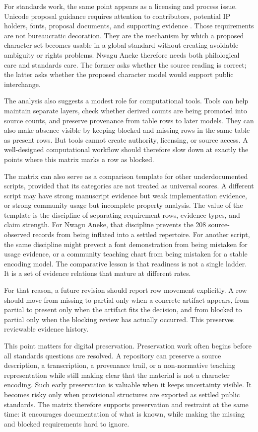\documentclass[sigconf,nonacm]{acmart}
\begin{document}
For standards work, the same point appears as a licensing and process issue.
Unicode proposal guidance requires attention to contributors, potential IP
holders, fonts, proposal documents, and supporting evidence
\cite{unicodeProposals}. Those requirements are not bureaucratic decoration.
They are the mechanism by which a proposed character set becomes usable in a
global standard without creating avoidable ambiguity or rights problems. Nwagu
Aneke therefore needs both philological care and standards care. The former
asks whether the source reading is correct; the latter asks whether the
proposed character model would support public interchange.

The analysis also suggests a modest role for computational tools. Tools can
help maintain separate layers, check whether derived counts are being promoted
into source counts, and preserve provenance from table rows to later models.
They can also make absence visible by keeping blocked and missing rows in the
same table as present rows. But tools cannot create authority, licensing, or
source access. A well-designed computational workflow should therefore slow
down at exactly the points where this matrix marks a row as blocked.

The matrix can also serve as a comparison template for other underdocumented
scripts, provided that its categories are not treated as universal scores. A
different script may have strong manuscript evidence but weak implementation
evidence, or strong community usage but incomplete property analysis. The value
of the template is the discipline of separating requirement rows, evidence
types, and claim strength. For Nwagu Aneke, that discipline prevents the 208
source-observed records from being inflated into a settled repertoire. For
another script, the same discipline might prevent a font demonstration from
being mistaken for usage evidence, or a community teaching chart from being
mistaken for a stable encoding model. The comparative lesson is that readiness
is not a single ladder. It is a set of evidence relations that mature at
different rates.

For that reason, a future revision should report row movement explicitly. A row
should move from missing to partial only when a concrete artifact appears, from
partial to present only when the artifact fits the decision, and from blocked
to partial only when the blocking review has actually occurred.
This preserves reviewable evidence history.

This point matters for digital preservation. Preservation work often begins
before all standards questions are resolved. A repository can preserve a source
description, a transcription, a provenance trail, or a non-normative teaching
representation while still making clear that the material is not a character
encoding. Such early preservation is valuable when it keeps uncertainty
visible. It becomes risky only when provisional structures are exported as
settled public standards. The matrix therefore supports preservation and
restraint at the same time: it encourages documentation of what is known, while
making the missing and blocked requirements hard to ignore.
\end{document}

